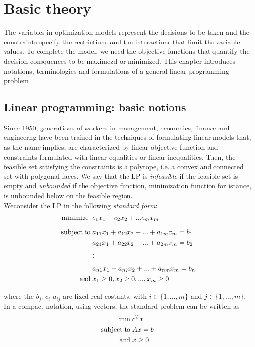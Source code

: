 \documentclass[a4paper,10 pt,titlepage,twoside]{book}
\theoremstyle{plain}
\theoremstyle{definition}
\theoremstyle{remark}
\begin{document}
%
\chapter{Basic theory}
The variables in optimization models represent the decisions to be taken and the constraints specify the restrictions and the interactions that limit the variable values.
To complete the model, we need the objective functions that quantify the decision consquences to be maximezd or minimized. This chapter introduces notations, terminologies and formulations of a general linear programming problem .

\section{Linear programming: basic notions}

Since 1950, generations of workers in management, economics, finance and engineerng have been trained in the techniques of formulating linear models that,
as the name implies, are characterized by linear objective function and constraints formulated with linear equalities or linear inequalities.
Then, the feasible set satisfying the constraints is a polytope, i.e. a convex and connected set with polygonal faces. We say that the LP is \textit{infeasible} if the feasible set is empty and \textit{unbounded} if the objective function, minimization function for istance, is unbounded below on the feasible region.\\
Weconsider the LP in the following \textit{standard form}:
\begin{alignat*}{1}\label{eq:stdform}
\text{minimize\;}\; &c_1 x_1 + c_2 x_2+ ... c_m x_m\\[2mm]
\text{subject\;to\;} &a_{11} x_1 + a_{12} x_2+ ... +a_{1m}x_m = b_1\\
&a_{21} x_1 + a_{22} x_2 + ... + a_{2m} x_m= b_2\\
&\vdots\\
&a_{n1} x_1 + a_{n2} x_2 + ... + a_{nm} x_m= b_n\\
\text{and}\; & x_1 \geq 0 , x_2 \geq 0, ... , x_m \geq 0
 \end{alignat*}

where the $b_{j}$, $c_{i}$  $a_{ij}$ are fixed real costants, with $i \in\{1,...,m\}$ and $j\in\{1,...,m\}$.\\ In a compact notation, using vectors, the standard problem can be written as
\begin{equation}\label{(Prim)}
 \begin{split}
\min\;&c^{T}x\\
\text{subject\;to\;}&Ax= b\;\\\text{and\;}&x\geq0
 \end{split}
\end{equation}
\end{document}
